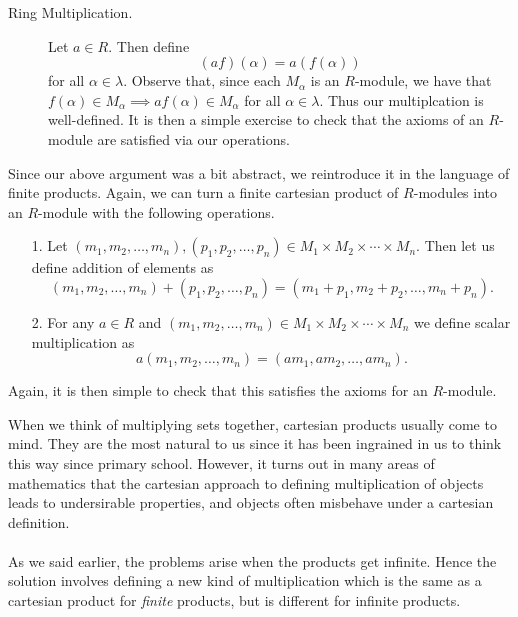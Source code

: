 \begin{definition}
\begin{prf}
\begin{description}
            \item[Ring Multiplication.] Let $a \in R$. Then define 
            \[
                (af)(\alpha) = a(f(\alpha))  
            \] 
            for all $\alpha \in \lambda$. Observe that, since each
            $M_\alpha$ is an $R$-module, we have that $f(\alpha) \in
            M_\alpha \implies af(\alpha) \in M_\alpha$ for all $\alpha
            \in \lambda$. Thus our multiplcation is well-defined. It is then a simple exercise to check that
            the axioms of an $R$-module are satisfied via our operations.
        \end{description}
    \end{prf}

    Since our above argument was a bit abstract, we reintroduce
    it in the language of finite products.
    Again, we can turn a finite cartesian product of
    $R$-modules into an $R$-module with the following operations.
\begin{itemize}
    \item[1.] Let $(m_1, m_2, \dots, m_n), (p_1, p_2 ,\dots,
    p_n) \in M_1 \times M_2 \times \cdots \times M_n$. Then let us define
    addition of elements as
    \[
        (m_1, m_2, \dots, m_n) + (p_1, p_2 ,\dots, p_n)
        = (m_1 + p_1, m_2 + p_2, \dots, m_n + p_n).
    \] 
    \item[2.] For any $a \in R$ and $(m_1, m_2, \dots, m_n) \in
    M_1 \times M_2 \times \cdots \times M_n$ we define scalar
    multiplication as 
    \[
        a(m_1, m_2, \dots, m_n) = (am_1, am_2, \dots, am_n).
    \] 
\end{itemize}
\end{definition}
Again, it is then simple to check that this satisfies the axioms
for an $R$-module. 

\textcolor{NavyBlue}{When we think of multiplying sets together,
cartesian products usually come to mind. They are the most natural
to us since it has been ingrained in us to think this way since
primary school. However, it turns out in many areas of mathematics
that the cartesian approach to defining multiplication of objects
leads to undersirable properties, and objects often misbehave
under a cartesian definition. 
\\
\\
As we said earlier, the problems arise when the products get
infinite. Hence the solution involves defining a new kind of
multiplication which is the same as a cartesian product for
\textit{finite} products, but is different for infinite products.}

